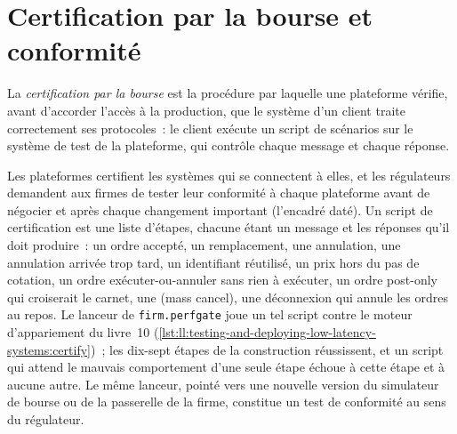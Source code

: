 \label{lst:ll:testing-and-deploying-low-latency-systems:trusting}

\section{Certification par la bourse et conformité}

\begin{definition}\label{def:ll:testing-and-deploying-low-latency-systems:cert}
La \emph{certification par la bourse} est la procédure par laquelle une plateforme vérifie, avant d'accorder l'accès à
la production, que le système d'un client traite correctement ses protocoles~: le client exécute un script de scénarios sur le système de test
de la plateforme, qui contrôle chaque message et chaque réponse.
\end{definition}

Les plateformes certifient les systèmes qui se connectent à elles, et les régulateurs demandent aux firmes de tester leur conformité à chaque plateforme avant
de négocier et après chaque changement important (l'encadré daté). Un script de certification est une liste d'étapes, chacune étant un message et les
réponses qu'il doit produire~: un ordre accepté, un remplacement, une annulation, une annulation arrivée trop tard, un identifiant réutilisé, un prix
hors du pas de cotation, un ordre exécuter-ou-annuler sans rien à exécuter, un ordre post-only qui croiserait le carnet, une
 (mass cancel), une déconnexion qui annule les ordres au repos. Le lanceur de \texttt{firm.perfgate} joue un tel script contre le moteur d'appariement du livre~10
(\cref{lst:ll:testing-and-deploying-low-latency-systems:certify})~; les dix-sept étapes de la construction réussissent, et un script qui attend
le mauvais comportement d'une seule étape échoue à cette étape et à aucune autre. Le même lanceur, pointé vers une nouvelle version du
simulateur de bourse ou de la passerelle de la firme, constitue un test de conformité au sens du régulateur.

\label{lst:ll:testing-and-deploying-low-latency-systems:certify}

